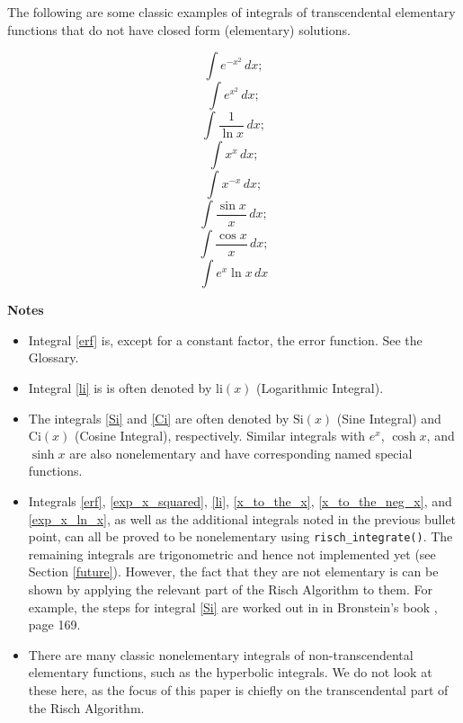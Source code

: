 \renewcommand{\thefootnote}{\fnsymbol{footnote}}	
The following are some classic examples of integrals of transcendental
elementary functions that do not have closed form (\gls{elementary})
solutions.

\begin{equation}
\label{erf}
\int{e^{-x^2}\,dx};
\end{equation}
\begin{equation}
\label{exp_x_squared}
\int{e^{x^2}\,dx};
\end{equation}
\begin{equation}
\label{li}
\int{\frac{1}{\ln{x}}\,dx};
\end{equation}
\begin{equation}
\label{x_to_the_x}
\int{x^x\,dx};
\end{equation}
\begin{equation}
\label{x_to_the_neg_x}
\int{x^{-x}\,dx};
\end{equation}
\begin{equation}
\label{Si}
\int{\frac{\sin{x}}{x}\,dx};
\end{equation}
\begin{equation}
\label{Ci}
\int{\frac{\cos{x}}{x}\,dx};
\end{equation}
\begin{equation}
\label{exp_x_ln_x}
\int{e^x\ln{x}\,dx}
\end{equation}

\textbf{Notes}
\begin{itemize}
\item Integral \ref{erf} is, except for a constant factor, the
\gls{error function}.  See the Glossary.
\item Integral \ref{li} is is often denoted by $\mathrm{li}(x)$
(Logarithmic Integral).
\item The integrals \ref{Si} and \ref{Ci} are often denoted by
$\mathrm{Si}(x)$ (Sine Integral) and $\mathrm{Ci}(x)$ (Cosine Integral),
respectively.  Similar integrals with $e^x$, $\cosh{x}$, and $\sinh{x}$
are also nonelementary and have corresponding named special functions.
\item Integrals \ref{erf}, \ref{exp_x_squared}, \ref{li},
\ref{x_to_the_x}, \ref{x_to_the_neg_x}, and \ref{exp_x_ln_x}, as well as
the additional integrals noted in the previous bullet point, can all be
proved to be non\-el\-e\-men\-tary using \texttt{risch\_integrate()}.
The remaining integrals are trigonometric and hence not implemented yet
(see Section \ref{future}).  However, the fact that they are not
elementary is can be shown by applying the relevant part of the Risch
Algorithm to them. For example, the steps  for integral \ref{Si} are
worked out in in Bronstein's book \cite{bronstein2005symbolic}, page 169.
\item There are many classic nonelementary integrals of
non-transcendental elementary functions, such as the hyperbolic
integrals.  We do not look at these here, as the focus of this paper is
chiefly on the transcendental part of the Risch Algorithm.
\end{itemize}